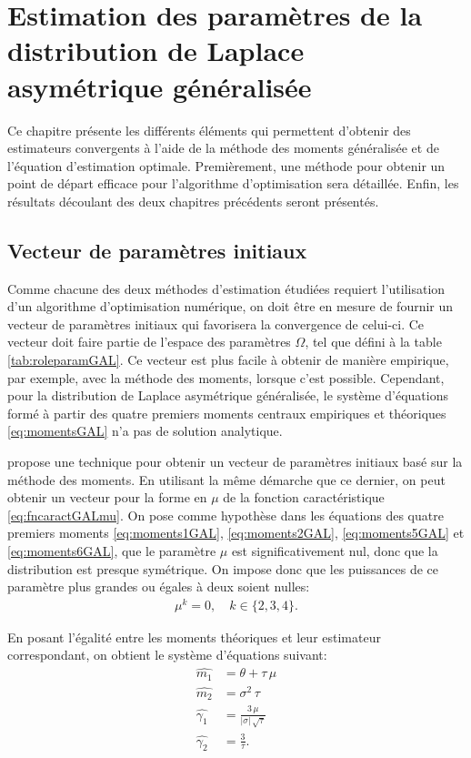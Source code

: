 \chapter{Estimation des paramètres de la distribution de Laplace
  asymétrique généralisée}

Ce chapitre présente les différents éléments qui permettent d'obtenir
des estimateurs convergents à l'aide de la méthode des moments
généralisée et de l'équation d'estimation optimale. Premièrement, une
méthode pour obtenir un point de départ efficace pour l'algorithme
d'optimisation sera détaillée. Enfin, les résultats découlant des deux
chapitres précédents seront présentés.

\section{Vecteur de paramètres initiaux}
\label{sec:condinitGAL}

Comme chacune des deux méthodes d'estimation étudiées requiert
l'utilisation d'un algorithme d'optimisation numérique, on doit être
en mesure de fournir un vecteur de paramètres initiaux qui favorisera
la convergence de celui-ci. Ce vecteur doit faire partie de l'espace
des paramètres $\Omega$, tel que défini à la table
\ref{tab:roleparamGAL}. Ce vecteur est plus facile à obtenir de
manière empirique, par exemple, avec la méthode des moments, lorsque
c'est possible. Cependant, pour la distribution de Laplace asymétrique
généralisée, le système d'équations formé à partir des quatre premiers
moments centraux empiriques et théoriques \eqref{eq:momentsGAL} n'a
pas de solution analytique.

\cite{seneta2004fitting} propose une technique pour obtenir un vecteur
de paramètres initiaux basé sur la méthode des moments. En utilisant
la même démarche que ce dernier, on peut obtenir un vecteur pour la
forme en $\mu$ de la fonction caractéristique
\eqref{eq:fncaractGALmu}. On pose comme hypothèse dans les équations
des quatre premiers moments \eqref{eq:moments1GAL},
\eqref{eq:moments2GAL}, \eqref{eq:moments5GAL} et
\eqref{eq:moments6GAL}, que le paramètre $\mu$ est significativement
nul, donc que la distribution est presque symétrique. On impose donc
que les puissances de ce paramètre plus grandes ou égales à deux
soient nulles:
\begin{align}
  \label{eq:hypotheseMoM}
  \mu^k=0, \quad k\in\{2,3,4\}.
\end{align}

En posant l'égalité entre les moments théoriques et leur estimateur
correspondant, on obtient le système d'équations suivant:
\begin{align*}
  \hat{m_1} &= \theta+\tau\,\mu \\
  \hat{m_2} &= {\sigma}^{2}\,\tau \\
  \hat{\gamma_1} &= \frac{3\,\mu}{\left| \sigma\right| \,\sqrt{\tau}} \\
  \hat{\gamma_2} &= \frac{3}{\tau}.
\end{align*}

